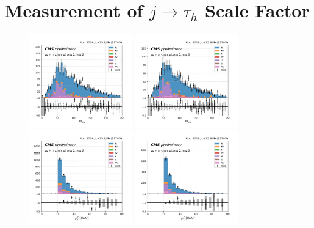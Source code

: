 

\chapter{Measurement of \texorpdfstring{$j \to \tau_h$}{Lg} Scale Factor}

\begin{figure}
    \centering
    \includegraphics[width=0.4\textwidth]{chapters/Appendix/sectionJetToTauh/figures/emutau_dilepton_mass_pickles_lltauTight.png}
    \includegraphics[width=0.4\textwidth]{chapters/Appendix/sectionJetToTauh/figures/emutau_dilepton_mass_pickles_lltauVTight.png}
    \includegraphics[width=0.4\textwidth]{chapters/Appendix/sectionJetToTauh/figures/emutau_tauPt_pickles_lltauTight.png}
    \includegraphics[width=0.4\textwidth]{chapters/Appendix/sectionJetToTauh/figures/emutau_tauPt_pickles_lltauVTight.png}

\end{figure}
